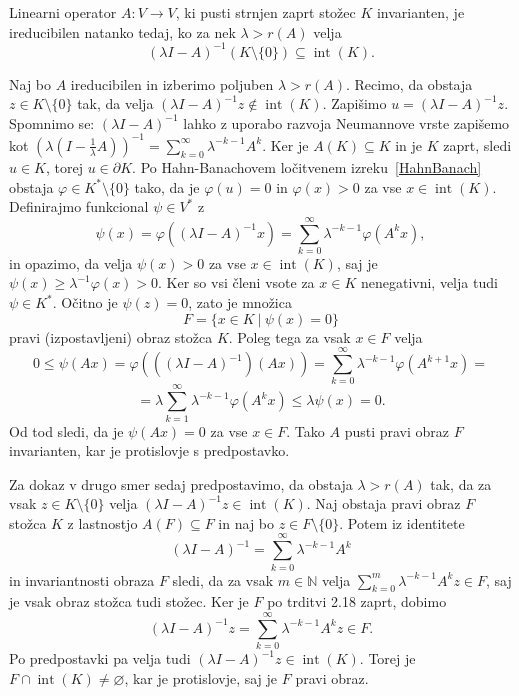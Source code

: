 \documentclass[mat2, tisk]{fmfdelo}
\newcommand{\N}{\mathbb{N}}
\begin{document}
\begin{trditev}
  Linearni operator \(A : V \to V\), ki pusti strnjen zaprt stožec \(K\) invarianten, 
  je ireducibilen natanko tedaj, ko za nek \(\lambda > r(A)\) velja
\[
{(\lambda I - A)}^{-1}(K \setminus \{0\}) \subseteq \operatorname{int}(K).
\]
\end{trditev}
\begin{dokaz}
Naj bo $A$ ireducibilen in izberimo poljuben $\lambda > r(A)$. Recimo, da obstaja
$z \in K \setminus \{0\}$ tak, da velja
${(\lambda I - A)}^{-1}z \notin \operatorname{int}(K)$.
Zapišimo $u = {(\lambda I - A)}^{-1}z$.
Spomnimo se: ${(\lambda I - A)}^{-1}$ lahko z uporabo razvoja Neumannove vrste
zapišemo kot ${(\lambda (I - \frac{1}{\lambda}A))}^{-1} =
\sum\limits_{k=0}^{\infty} \lambda^{-k-1} A^k$.
Ker je $A(K)\subseteq K$ in je $K$ zaprt, sledi $u\in K$, torej $u\in\partial K$.
Po Hahn-Banachovem ločitvenem izreku~\ref{HahnBanach} obstaja
$\varphi \in K^* \setminus \{0\}$ tako, da je $\varphi(u) = 0$ in
$\varphi(x) > 0$ za vse $x \in \operatorname{int}(K)$.
Definirajmo funkcional $\psi \in V^*$ z
\[
\psi(x) = \varphi({(\lambda I - A)}^{-1}x)
        = \sum\limits_{k=0}^{\infty} \lambda^{-k-1} \varphi(A^k x),
\]
in opazimo, da velja $\psi(x) > 0$ za vse $x \in \operatorname{int}(K)$,
saj je $\psi(x)\geq\lambda^{-1}\varphi(x)>0$.
Ker so vsi členi vsote za $x\in K$ nenegativni, velja tudi $\psi\in K^*$.
Očitno je $\psi(z) = 0$, zato je množica
\[
F = \{x \in K ~|~ \psi(x) = 0\}
\]
pravi (izpostavljeni) obraz stožca $K$.
Poleg tega za vsak $x \in F$ velja
\[
0 \leq \psi(Ax)
   = \varphi(({(\lambda I - A)}^{-1})(Ax))
   = \sum\limits_{k=0}^{\infty} \lambda^{-k-1} \varphi(A^{k+1}x) =
\]
\[
= \lambda \sum\limits_{k=1}^{\infty} \lambda^{-k-1} \varphi(A^k x)
  \leq \lambda \psi(x) = 0.
\]
Od tod sledi, da je $\psi(Ax) = 0$ za vse $x \in F$.
Tako $A$ pusti pravi obraz $F$ invarianten, kar je protislovje s predpostavko.

Za dokaz v drugo smer sedaj predpostavimo, da obstaja $\lambda > r(A)$
tak, da za vsak $z \in K \setminus \{0\}$ velja
${(\lambda I - A)}^{-1}z \in \operatorname{int}(K)$.
Naj obstaja pravi obraz $F$ stožca $K$ z lastnostjo $A(F) \subseteq F$
in naj bo $z \in F\setminus\{0\}$. Potem iz identitete
\[
{(\lambda I - A)}^{-1}
  = \sum\limits_{k=0}^{\infty} \lambda^{-k-1} A^k
\]
in invariantnosti obraza $F$ sledi, da za vsak $m\in\N$ velja
$\sum_{k=0}^{m}\lambda^{-k-1}A^kz\in F$, saj je vsak obraz stožca tudi stožec.
Ker je $F$ po trditvi 2.18 zaprt, dobimo
\[
{(\lambda I - A)}^{-1} z
= \sum\limits_{k=0}^{\infty} \lambda^{-k-1} A^k z \in F.
\]
Po predpostavki pa velja tudi
${(\lambda I - A)}^{-1}z\in\operatorname{int}(K)$.
Torej je $F\cap\operatorname{int}(K)\neq\varnothing$,
kar je protislovje, saj je $F$ pravi obraz.
\end{dokaz}
\end{document}
